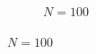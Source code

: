 \documentclass[final]{beamer}
\begin{document}
\begin{frame}[t]
\begin{columns}[t,totalwidth=0.6\paperwidth]
\begin{column}{0.45\textwidth}
\begin{figure}[H]
\begin{subfigure}[b]{0.32\textwidth}
        \caption{\(N = 100\)}
    \end{subfigure}

    \vspace{1em}


\end{figure}
\end{column}
\end{columns}
\end{frame}
\end{document}
